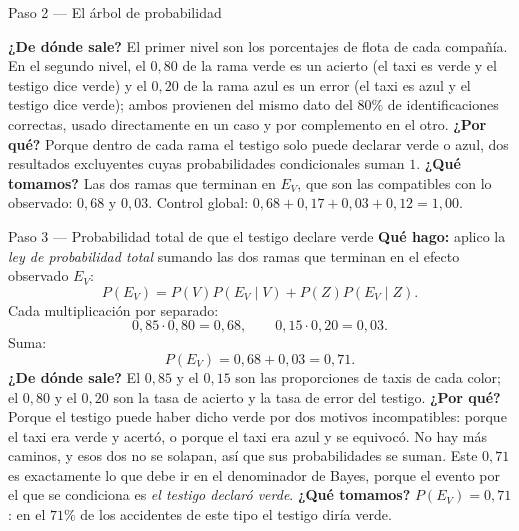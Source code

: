 \documentclass[11pt]{article}
\begin{document}
\begin{sol}
\begin{paso}{Paso 2 --- El árbol de probabilidad}
\begin{center}
\shorthandoff{<>}
\shorthandon{<>}
\end{center}

\textbf{¿De dónde sale?} El primer nivel son los porcentajes de flota de cada compañía. En el segundo nivel, el $0,80$ de la rama verde es un acierto (el taxi es verde y el testigo dice verde) y el $0,20$ de la rama azul es un error (el taxi es azul y el testigo dice verde); ambos provienen del mismo dato del $80\%$ de identificaciones correctas, usado directamente en un caso y por complemento en el otro.
\textbf{¿Por qué?} Porque dentro de cada rama el testigo solo puede declarar verde o azul, dos resultados excluyentes cuyas probabilidades condicionales suman $1$.
\textbf{¿Qué tomamos?} Las dos ramas que terminan en $E_V$, que son las compatibles con lo observado: $0,68$ y $0,03$. Control global: $0,68+0,17+0,03+0,12=1,00$.
\end{paso}

\begin{paso}{Paso 3 --- Probabilidad total de que el testigo declare verde}
\textbf{Qué hago:} aplico la \emph{ley de probabilidad total} sumando las dos ramas que terminan en el efecto observado $E_V$:
\[
P(E_V)=P(V)P(E_V\mid V)+P(Z)P(E_V\mid Z).
\]
Cada multiplicación por separado:
\[
0,85\cdot 0,80=0,68,\qquad 0,15\cdot 0,20=0,03 .
\]
Suma:
\[
P(E_V)=0,68+0,03=0,71 .
\]
\textbf{¿De dónde sale?} El $0,85$ y el $0,15$ son las proporciones de taxis de cada color; el $0,80$ y el $0,20$ son la tasa de acierto y la tasa de error del testigo.
\textbf{¿Por qué?} Porque el testigo puede haber dicho verde por dos motivos incompatibles: porque el taxi era verde y acertó, o porque el taxi era azul y se equivocó. No hay más caminos, y esos dos no se solapan, así que sus probabilidades se suman. Este $0,71$ es exactamente lo que debe ir en el denominador de Bayes, porque el evento por el que se condiciona es \emph{el testigo declaró verde}.
\textbf{¿Qué tomamos?} $P(E_V)=0,71$: en el $71\%$ de los accidentes de este tipo el testigo diría verde.
\end{paso}


\end{sol}
\end{document}
